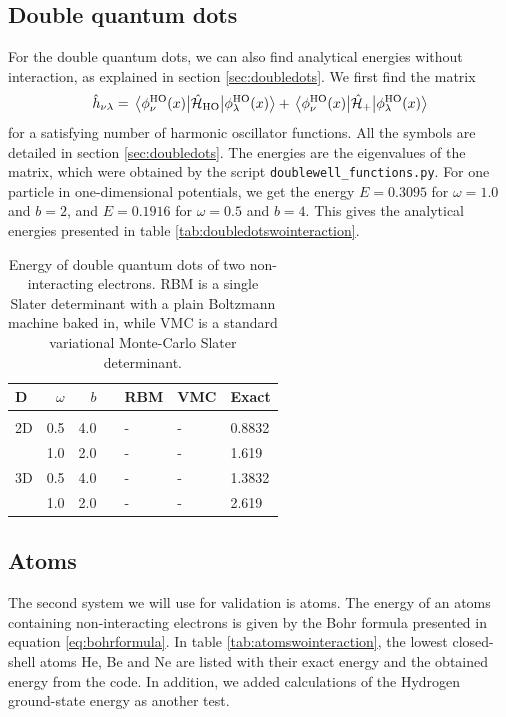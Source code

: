 \subsection{Double quantum dots}
For the double quantum dots, we can also find analytical energies without interaction, as explained in section \ref{sec:doubledots}. We first find the matrix 
\begin{equation*}
\hat{h}_{\nu\lambda}=\mel{\phi_{\nu}^{\text{HO}}(x)}{\hat{\mathcal{H}}_{\text{HO}}}{\phi_{\lambda}^{\text{HO}}(x)}+\mel{\phi_{\nu}^{\text{HO}}(x)}{\hat{\mathcal{H}}_{\text{+}}}{\phi_{\lambda}^{\text{HO}}(x)}
\end{equation*}
for a satisfying number of harmonic oscillator functions. All the symbols are detailed in section \ref{sec:doubledots}. The energies are the eigenvalues of the matrix, which were obtained by the script \texttt{doublewell\_functions.py}. For one particle in one-dimensional potentials, we get the energy $E=0.3095$ for $\omega=1.0$ and $b=2$, and $E=0.1916$ for $\omega=0.5$ and $b=4$. This gives the analytical energies presented in table \eqref{tab:doubledotswointeraction}. 
\begin{table} [H]
	\caption{Energy of double quantum dots of two non-interacting electrons. RBM is a single Slater determinant with a plain Boltzmann machine baked in, while VMC is a standard variational Monte-Carlo Slater determinant.}
	\label{tab:doubledotswointeraction}
	\begin{tabularx}{\textwidth}{lrrrR{3.5cm}R{3.5cm}R{3.5cm}} \hline\hline
		D & $\omega$ & $b$ & \makecell{\\ \phantom{=}} & RBM & VMC & Exact \\ \hline \\
		
		2D & 0.5 & 4.0 && - & - & 0.8832 \\
		& 1.0 & 2.0 && - & - & 1.619 \\
		3D & 0.5 & 4.0 && - & - & 1.3832 \\
		& 1.0 & 2.0 && - & - & 2.619 \\ \hline\hline
	\end{tabularx}
\end{table}

\iffalse
\subsection{Atoms}
The second system we will use for validation is atoms. The energy of an atoms containing non-interacting electrons is given by the Bohr formula presented in equation \eqref{eq:bohrformula}. In table \eqref{tab:atomswointeraction}, the lowest closed-shell atoms He, Be and Ne are listed with their exact energy and the obtained energy from the code. In addition, we added calculations of the Hydrogen ground-state energy as another test.

